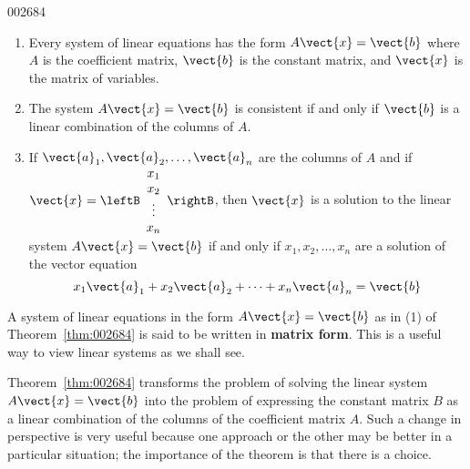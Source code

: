 \begin{theorem}{}{002684}
\begin{enumerate}
\item Every system of linear equations has the form $A\vect{x} = \vect{b}$ where $A$ is the coefficient matrix, $\vect{b}$ is the constant matrix, and $\vect{x}$ is the matrix of variables.

\item The system $A\vect{x} = \vect{b}$ is consistent if and only if $\vect{b}$ is a linear combination of the columns of $A$.

\item If $\vect{a}_{1}, \vect{a}_{2}, \dots, \vect{a}_{n}$ are the columns of $A$ and if $\vect{x} = \leftB \begin{array}{c}
x_{1} \\
x_{2} \\
\vdots \\
x_{n}
\end{array} \rightB$, then $\vect{x}$ is a solution to the linear system $A\vect{x} = \vect{b}$ if and only if $x_{1}, x_{2}, \dots, x_{n}$ are a solution of the vector equation 
\begin{equation*}
x_{1}\vect{a}_{1} + x_{2}\vect{a}_{2} + \cdots  + x_{n}\vect{a}_{n} = \vect{b}
\end{equation*}
\end{enumerate}
\end{theorem}

\noindent A system of linear equations in the form $A\vect{x} = \vect{b}$ as in (1) of Theorem~\ref{thm:002684} is said to be written in \textbf{matrix form}. This is a useful way to view linear systems as we shall see.


Theorem~\ref{thm:002684} transforms the problem of solving the linear system $A\vect{x} = \vect{b}$ into the problem of expressing the constant matrix $B$ as a linear combination of the columns of the coefficient matrix $A$. Such a change in perspective is very useful because one approach or the other may be better in a particular situation; the importance of the theorem is that there is a choice.


